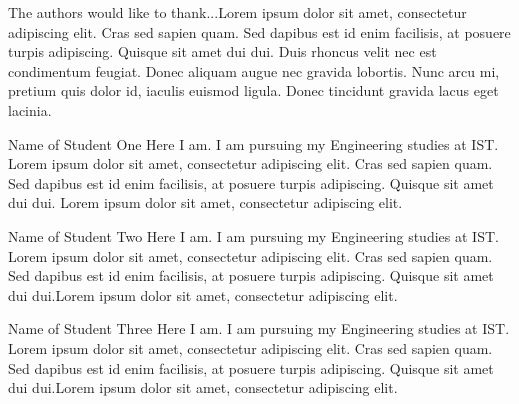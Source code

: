 \documentclass[a4paper,12pt,journal,twoside,compsoc]{PPIEEEtran}
\begin{document}
The authors would like to thank...Lorem ipsum dolor sit amet, consectetur adipiscing elit. Cras sed sapien quam. Sed dapibus est id enim facilisis, at posuere turpis adipiscing. Quisque sit amet dui dui.
Duis rhoncus velit nec est condimentum feugiat. Donec aliquam augue nec gravida lobortis. Nunc arcu mi, pretium quis dolor id, iaculis euismod ligula. Donec tincidunt gravida lacus eget lacinia.

%

% 
\begin{IEEEbiography}{Name of Student One}
Here I am. I am pursuing my Engineering studies at \ac{IST}. Lorem ipsum dolor sit amet, consectetur adipiscing elit. Cras sed sapien quam. Sed dapibus est id enim facilisis, at posuere turpis adipiscing. Quisque sit amet dui dui. Lorem ipsum dolor sit amet, consectetur adipiscing elit. 
\end{IEEEbiography}
\begin{IEEEbiography}
{Name of Student Two}
Here I am. I am pursuing my Engineering studies at \ac{IST}. Lorem ipsum dolor sit amet, consectetur adipiscing elit. Cras sed sapien quam. Sed dapibus est id enim facilisis, at posuere turpis adipiscing. Quisque sit amet dui dui.Lorem ipsum dolor sit amet, consectetur adipiscing elit. 
\end{IEEEbiography}
\begin{IEEEbiography}
{Name of Student Three}
Here I am. I am pursuing my Engineering studies at \ac{IST}. Lorem ipsum dolor sit amet, consectetur adipiscing elit. Cras sed sapien quam. Sed dapibus est id enim facilisis, at posuere turpis adipiscing. Quisque sit amet dui dui.Lorem ipsum dolor sit amet, consectetur adipiscing elit. 
\end{IEEEbiography}
\end{document}
